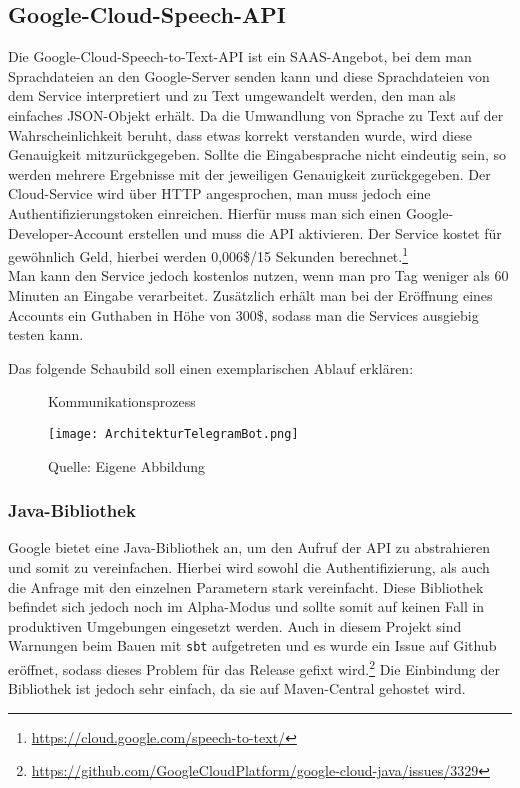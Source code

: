 \subsection{Google-Cloud-Speech-API}
Die Google-Cloud-Speech-to-Text-API ist ein SAAS-Angebot, bei dem man Sprachdateien an den Google-Server senden kann und diese Sprachdateien von dem Service interpretiert und zu Text umgewandelt werden, den man als einfaches JSON-Objekt erhält. Da die Umwandlung von Sprache zu Text auf der Wahrscheinlichkeit beruht, dass etwas korrekt verstanden wurde, wird diese Genauigkeit mitzurückgegeben. Sollte die Eingabesprache nicht eindeutig sein, so werden mehrere Ergebnisse mit der jeweiligen Genauigkeit zurückgegeben.
Der Cloud-Service wird über HTTP angesprochen, man muss jedoch eine Authentifizierungstoken einreichen. Hierfür muss man sich einen Google-Developer-Account erstellen und muss die API aktivieren. Der Service kostet für gewöhnlich Geld, hierbei werden 0,006\$/15 Sekunden berechnet.\footnote{\url{https://cloud.google.com/speech-to-text/}} \\
Man kann den Service jedoch kostenlos nutzen, wenn man pro Tag weniger als 60 Minuten an Eingabe verarbeitet. Zusätzlich erhält man bei der Eröffnung eines Accounts ein Guthaben in Höhe von 300\$, sodass man die Services ausgiebig testen kann.

Das folgende Schaubild soll einen exemplarischen Ablauf erklären:
\begin{figure}[H]
    \centering
    \caption{Kommunikationsprozess}
      \texttt{[image: ArchitekturTelegramBot.png]}
      \label{img:architektur}
    \caption*{Quelle: Eigene Abbildung}
\end{figure}

\subsubsection{Java-Bibliothek}
Google bietet eine Java-Bibliothek an, um den Aufruf der API zu abstrahieren und somit zu vereinfachen. Hierbei wird sowohl die Authentifizierung, als auch die Anfrage mit den einzelnen Parametern stark vereinfacht. Diese Bibliothek befindet sich jedoch noch im Alpha-Modus und sollte somit auf keinen Fall in produktiven Umgebungen eingesetzt werden. Auch in diesem Projekt sind Warnungen beim Bauen mit \texttt{sbt} aufgetreten und es wurde ein Issue auf Github eröffnet, sodass dieses Problem für das Release gefixt wird.\footnote{\url{https://github.com/GoogleCloudPlatform/google-cloud-java/issues/3329}} 
Die Einbindung der Bibliothek ist jedoch sehr einfach, da sie auf Maven-Central gehostet wird.

